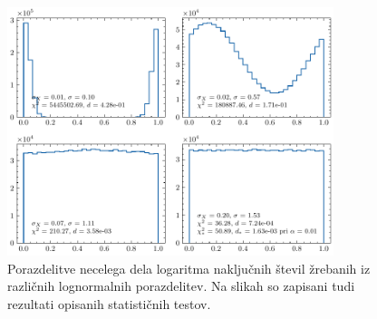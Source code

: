 \documentclass[11pt, oneside]{article}
\theoremstyle{definition}
\begin{document}
\newpage

\vspace*{0.45cm}

\begin{figure}[h!]
    \centering
    \includegraphics[width=0.85\textwidth]{lognorm_uniform_hists.pdf}
    \caption{Porazdelitve necelega dela logaritma naključnih števil žrebanih iz različnih lognormalnih porazdelitev.
        Na slikah so zapisani tudi rezultati opisanih statističnih testov.}
    \label{fig: lognorm_uni}
\end{figure}
\end{document}
